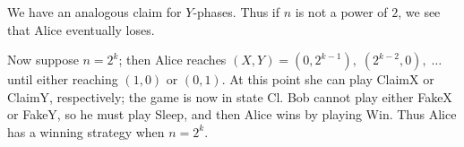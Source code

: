 \documentclass[11pt]{scrartcl}
\begin{document}
We have an analogous claim for $Y$-phases.
Thus if $n$ is not a power of $2$, we see that Alice eventually loses.

Now suppose $n = 2^k$;
then Alice reaches $(X,Y) = (0,2^{k-1}), \; (2^{k-2}, 0), \; \dots$
until either reaching $(1,0)$ or $(0,1)$.
At this point she can play ClaimX or ClaimY, respectively;
the game is now in state Cl.
Bob cannot play either FakeX or FakeY, so he must play Sleep,
and then Alice wins by playing Win.
Thus Alice has a winning strategy when $n = 2^k$.
\pagebreak
\end{document}
